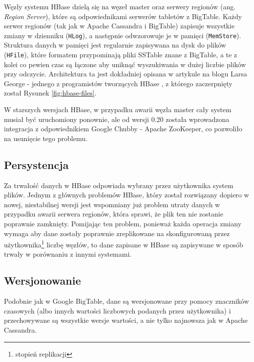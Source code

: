 Węzły systemu HBase dzielą się na węzeł master oraz serwery regionów (ang. \emph{Region Server}), które są odpowiednikami serwerów tabletów z BigTable.
Każdy serwer regionów (tak jak w Apache Cassandra i BigTable) zapisuje wszystkie zmiany w dzienniku (\verb+HLog+), a następnie odwzorowuje je w pamięci (\verb+MemStore+).
Struktura danych w pamięci jest regularnie zapisywana na dysk do plików (\verb+HFile+), które formatem przypominają pliki SSTable znane z BigTable, a te z kolei co pewien czas są łączone aby uniknąć wyszukiwania w dużej liczbie plików przy odczycie.
Architektura ta jest dokładniej opisana w artykule na blogu Larsa George - jednego z programistów tworzących HBase \cite{george-hbase-storage}, z którego zaczerpnięty został Rysunek \ref{fig:hbase-files}. 


W starszych wersjach HBase, w przypadku awarii węzła master cały system musiał być uruchomiony ponownie, ale od wersji 0.20 została wprowadzona integracja z odpowiednikiem Google Chubby - Apache ZooKeeper, co pozwoliło na usunięcie tego problemu.

\subsection*{Persystencja}

Za trwałość danych w HBase odpowiada wybrany przez użytkownika system plików.
Jednym z głównych problemów HBase, który został rozwiązany dopiero w nowej, niestabilnej wersji jest wspomniany już problem utraty danych w przypadku awarii serwera regionów, która sprawi, że plik ten nie zostanie poprawnie zamknięty.
Pomijając ten problem, ponieważ każda operacja zmiany wymaga aby dane zostały poprawnie zreplikowane na skonfigurowaną przez użytkownika\footnote{stopień replikacji} liczbę węzłów, to dane zapisane w HBase są zapisywane w sposób trwały w porównaniu z innymi systemami.

\subsection*{Wersjonowanie}

Podobnie jak w Google BigTable, dane są wersjonowane przy pomocy znaczników czasowych (albo innych wartości liczbowych podanych przez użytkownika) i przechowywane są wszystkie wersje wartości, a nie tylko najnowsza jak w Apache Cassandra.

